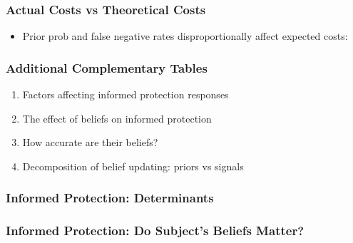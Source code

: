 \documentclass[11pt,hyperref={bookmarks=false}]{beamer}
\begin{document}
\begin{frame}
\frametitle{Actual Costs vs Theoretical Costs}
\begin{itemize}
\item Prior prob and false negative rates disproportionally affect expected costs:
\end{itemize}
\footnotesize

\end{frame}


\begin{frame}
\frametitle{Additional Complementary Tables}
\begin{enumerate}
\item Factors affecting informed protection responses
\item The effect of beliefs on informed protection
\item How accurate are their beliefs?
\item Decomposition of belief updating: priors vs signals
\end{enumerate}
\end{frame}



\begin{frame}
\frametitle{Informed Protection: Determinants}
\footnotesize


\end{frame}


\begin{frame}
\frametitle{Informed Protection: Do Subject's Beliefs Matter?}

\end{frame}
\end{document}
